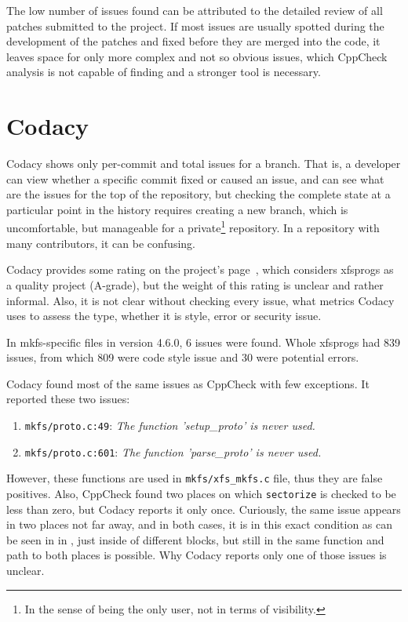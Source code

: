 The low number of issues found can be attributed to the detailed review of all
patches submitted to the project. If most issues are usually spotted during the
development of the patches and fixed before they are merged into the code, it
leaves space for only more complex and not so obvious issues, which CppCheck
analysis is not capable of finding and a stronger tool is necessary.

\section{Codacy}\label{chap:results:codacy}
Codacy shows only per-commit and total issues for a branch. That is, a
developer can view whether a specific commit fixed or caused an issue, and
can see what are the issues for the top of the repository, but checking the
complete state at a particular point in the history requires creating a new
branch, which is uncomfortable, but manageable for a private\footnote{In
the sense of being the only user, not in terms of visibility.} repository.
In a repository with many contributors, it can be confusing.

Codacy provides some rating on the project's page~\cite{codacyXfsprogs},
which considers xfsprogs as a quality project (A-grade), but the weight of
this rating is unclear and rather informal. Also, it is not clear without
checking every issue, what metrics Codacy uses to assess the type, whether
it is style, error or security issue.

In mkfs-specific files in version 4.6.0, 6 issues were found. Whole
xfsprogs had 839 issues, from which 809 were code style issue and 30 were
potential errors.

Codacy found most of the same issues as CppCheck with few exceptions. It
reported these two issues:
\begin{enumerate}
	\item {\tt mkfs/proto.c:49}: {\em The function 'setup\_proto' is
		never used.}
	\item {\tt mkfs/proto.c:601}: {\em The function 'parse\_proto' is
		never used.}
\end{enumerate}

However, these functions are used in {\tt mkfs/xfs\_mkfs.c} file, thus they are
false positives. Also, CppCheck found two places on which {\tt sectorize} is
checked to be less than zero, but Codacy reports it only once. Curiously, the
same issue appears in two places not far away, and in both cases, it is in this
exact condition as can be seen in  in
, just inside of different blocks, but still in the
same function and path to both places is possible. Why Codacy reports only
one of those issues is unclear.


